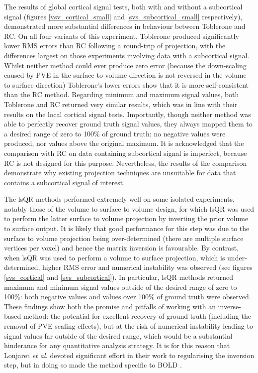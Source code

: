 \documentclass[review]{elsarticle}
\begin{document}
The results of global cortical signal tests, both with and without a subcortical signal (figures \ref{vsv_cortical_small} and \ref{svs_subcortical_small} respectively), demonstrated more substantial differences in behaviour between Toblerone and RC. On all four variants of this experiment, Toblerone produced significantly lower RMS errors than RC following a round-trip of projection, with the differences largest on those experiments involving data with a subcortical signal. Whilst neither method could ever produce zero error (because the down-scaling caused by PVE in the surface to volume direction is not reversed in the volume to surface direction) Toblerone's lower errors show that it is more self-consistent than the RC method. Regarding minimum and maximum signal values, both Toblerone and RC returned very similar results, which was in line with their results on the local cortical signal tests. Importantly, though neither method was able to perfectly recover ground truth signal values, they always mapped them to a desired range of zero to 100\% of ground truth: no negative values were produced, nor values above the original maximum. It is acknowledged that the comparison with RC on data containing subcortical signal is imperfect, because RC is not designed for this purpose. Nevertheless, the results of the comparison demonstrate why existing projection techniques are unsuitable for data that contains a subcortical signal of interest. 

The lsQR methods performed extremely well on some isolated experiments, notably those of the volume to surface to volume design, for which lsQR was used to perform the latter surface to volume projection by inverting the prior volume to surface output. It is likely that good performance for this step was due to the surface to volume projection being over-determined (there are multiple surface vertices per voxel) and hence the matrix inversion is favourable. By contrast, when lsQR was used to perform a volume to surface projection, which is under-determined, higher RMS error and numerical instability was observed (see figures \ref{svs_cortical} and \ref{svs_subcortical}). In particular, lsQR methods returned maximum and minimum signal values outside of the desired range of zero to 100\%: both negative values and values over 100\% of ground truth were observed. These findings show both the promise and pitfalls of working with an inverse-based method: the potential for excellent recovery of ground truth (including the removal of PVE scaling effects), but at the risk of numerical instability leading to signal values far outside of the desired range, which would be a substantial hinderance for any quantitative analysis strategy. It is for this reason that Lonjaret \textit{et al.} devoted significant effort in their work to regularising the inversion step, but in doing so made the method specific to BOLD \cite{Lonjaret2017}. 
\end{document}
